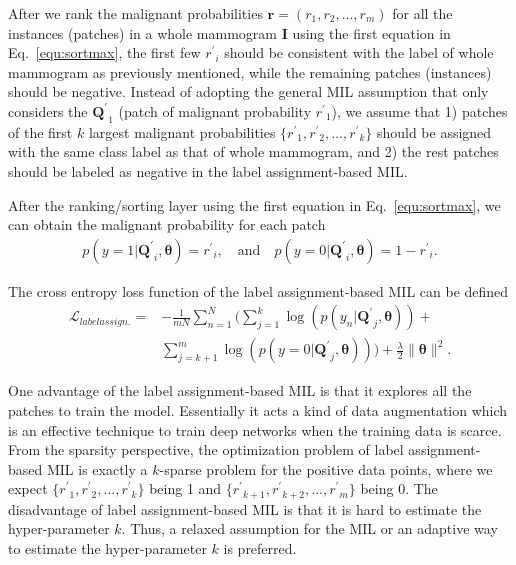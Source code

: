 \documentclass[runningheads,a4paper]{llncs}
\begin{document}
After we rank the malignant probabilities $\bm{r} = (r_{1}, r_{2}, ..., r_{m})$ for all the instances (patches) in a whole mammogram $\bm{I}$ using the first equation in Eq.~\ref{equ:sortmax}, the first few ${r^\prime}_i$ should be consistent with the label of whole mammogram as previously mentioned, while the remaining patches (instances) should be negative. Instead of adopting the general MIL assumption that only considers the ${\bm{Q}^\prime}_1$ (patch of malignant probability ${r^\prime}_1$), we assume that 1) patches of the first $k$ largest malignant probabilities $\{{r^\prime}_1, {r^\prime}_2, ..., {r^\prime}_k\}$ should be assigned with the same class label as that of whole mammogram, and 2) the rest patches should be labeled as negative in the label assignment-based MIL.

After the ranking/sorting layer using the first equation in Eq.~\ref{equ:sortmax}, we can obtain the malignant probability for each patch
\begin{equation}
\label{equ:ppatch}
\begin{aligned}
p(y=1 | {\bm{Q}^\prime}_i, \bm{\theta}) = {r^\prime}_i, \quad\text{and}\quad p(y=0 | {\bm{Q}^\prime}_i, \bm{\theta}) = 1-{r^\prime}_i.
\end{aligned}
\end{equation}

The cross entropy loss function of the label assignment-based MIL can be defined
\begin{equation}
\label{equ:weightedlabelloss}
\begin{aligned}
\mathcal{L}_{labelassign.} = &-\frac{1}{mN}\sum_{n=1}^{N}  \bigg ( \sum_{j=1}^{k} {\log(p(y_n | {\bm{Q}^\prime}_j, \bm{\theta}))}+ \\&\sum_{j=k+1}^{m} {\log(p(y=0 | {\bm{Q}^\prime}_j, \bm{\theta}))}\bigg )+\frac{\lambda}{2} \|\bm{\theta}\|^2.
\end{aligned}
\end{equation}

One advantage of the label assignment-based MIL is that it explores all the patches to train the model. Essentially it acts a kind of data augmentation which is an effective technique to train deep networks when the training data is scarce. From the sparsity perspective, the optimization problem of label assignment-based MIL is exactly a $k$-sparse problem for the positive data points, where we expect $\{{r^\prime}_1, {r^\prime}_2, ..., {r^\prime}_k\}$ being 1 and $\{{r^\prime}_{k+1}, {r^\prime}_{k+2}, ..., {r^\prime}_m\}$ being 0. The disadvantage of label assignment-based MIL is that it is hard to estimate the hyper-parameter $k$. Thus, a relaxed assumption for the MIL or an adaptive way to estimate the hyper-parameter $k$ is preferred. %
\end{document}
